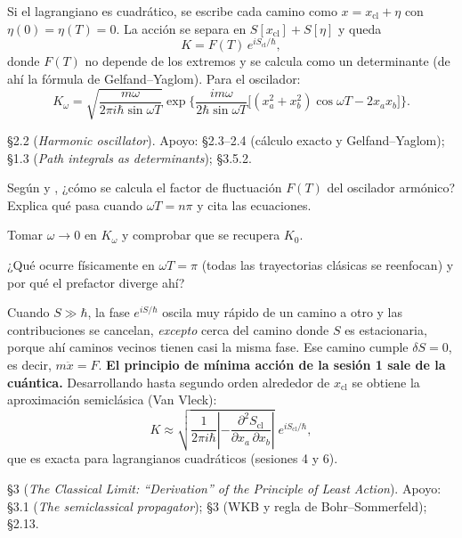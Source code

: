 Si el lagrangiano es cuadrático, se escribe cada camino como $x=x_{\text{cl}}+\eta$ con $\eta(0)=\eta(T)=0$. La acción se separa en $S[x_{\text{cl}}]+S[\eta]$ y queda
\[
K=F(T)\,e^{iS_{\text{cl}}/\hbar},
\]
donde $F(T)$ no depende de los extremos y se calcula como un determinante (de ahí la fórmula de Gelfand--Yaglom). Para el oscilador:
\[
K_\omega=\sqrt{\frac{m\omega}{2\pi i\hbar\sin\omega T}}\exp\Big\{\frac{im\omega}{2\hbar\sin\omega T}\big[(x_a^2+x_b^2)\cos\omega T-2x_ax_b\big]\Big\}.
\]

 \S2.2 (\textit{Harmonic oscillator}). Apoyo:  \S2.3--2.4 (cálculo exacto y Gelfand--Yaglom);  \S1.3 (\textit{Path integrals as determinants});  \S3.5.2.

\begin{prompt}
Según  y , ¿cómo se calcula el factor de fluctuación $F(T)$ del oscilador armónico? Explica qué pasa cuando $\omega T=n\pi$ y cita las ecuaciones.
\end{prompt}

Tomar $\omega\to0$ en $K_\omega$ y comprobar que se recupera $K_0$.

¿Qué ocurre físicamente en $\omega T=\pi$ (todas las trayectorias clásicas se reenfocan) y por qué el prefactor diverge ahí?


Cuando $S\gg\hbar$, la fase $e^{iS/\hbar}$ oscila muy rápido de un camino a otro y las contribuciones se cancelan, \emph{excepto} cerca del camino donde $S$ es estacionaria, porque ahí caminos vecinos tienen casi la misma fase. Ese camino cumple $\delta S=0$, es decir, $m\ddot x=F$. \textbf{El principio de mínima acción de la sesión 1 sale de la cuántica.} Desarrollando hasta segundo orden alrededor de $x_{\text{cl}}$ se obtiene la aproximación semiclásica (Van Vleck):
\[
K\approx\sqrt{\frac{1}{2\pi i\hbar}\left|-\frac{\partial^2S_{\text{cl}}}{\partial x_a\,\partial x_b}\right|}\;e^{iS_{\text{cl}}/\hbar},
\]
que es exacta para lagrangianos cuadráticos (sesiones 4 y 6).

 \S3 (\textit{The Classical Limit: ``Derivation'' of the Principle of Least Action}). Apoyo:  \S3.1 (\textit{The semiclassical propagator});  \S3 (WKB y regla de Bohr--Sommerfeld);  \S2.13.


